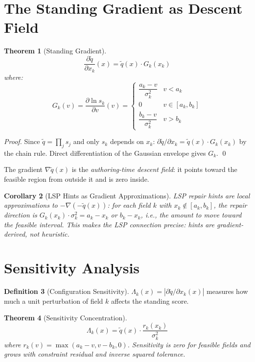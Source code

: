 \documentclass[12pt, letterpaper]{report}
\theoremstyle{plain}
\newtheorem{theorem}{Theorem}[chapter]
\newtheorem{corollary}[theorem]{Corollary}
\theoremstyle{definition}
\newtheorem{definition}[theorem]{Definition}
\theoremstyle{remark}
\newcommand{\abs}[1]{\left\lvert #1 \right\rvert}
\begin{document}
\section{The Standing Gradient as Descent Field}

\begin{theorem}[Standing Gradient]
\label{thm:gradient}
\[
  \frac{\partial \tilde{q}}{\partial x_k}(x) = \tilde{q}(x) \cdot G_k(x_k)
\]
where:
\[
  G_k(v) = \frac{\partial \ln s_k}{\partial v}(v) =
  \begin{cases}
    \dfrac{a_k - v}{\sigma_k^2} & v < a_k \\[8pt]
    0 & v \in [a_k, b_k] \\[4pt]
    \dfrac{b_k - v}{\sigma_k^2} & v > b_k
  \end{cases}
\]
\end{theorem}

\begin{proof}
Since $\tilde{q} = \prod_j s_j$ and only $s_k$ depends on $x_k$:
$\partial\tilde{q}/\partial x_k = \tilde{q}(x) \cdot G_k(x_k)$
by the chain rule. Direct differentiation of the Gaussian envelope
gives $G_k$. \qed
\end{proof}

The gradient $\nabla\tilde{q}(x)$ is the \emph{authoring-time descent
field}: it points toward the feasible region from outside it and is
zero inside.

\begin{corollary}[LSP Hints as Gradient Approximations]
LSP repair hints are local approximations to $-\nabla(-\tilde{q}(x))$:
for each field $k$ with $x_k \notin [a_k, b_k]$,
the repair direction is $G_k(x_k) \cdot \sigma_k^2 = a_k - x_k$ or
$b_k - x_k$, i.e., the amount to move toward the feasible interval.
This makes the LSP connection precise:
hints are gradient-derived, not heuristic.
\end{corollary}

\section{Sensitivity Analysis}

\begin{definition}[Configuration Sensitivity]
$\Lambda_k(x) = \abs{\partial\tilde{q}/\partial x_k(x)}$
measures how much a unit perturbation of field $k$ affects the standing score.
\end{definition}

\begin{theorem}[Sensitivity Concentration]
\label{thm:sensitivity}
\[
  \Lambda_k(x) = \tilde{q}(x) \cdot \frac{r_k(x_k)}{\sigma_k^2}
\]
where $r_k(v) = \max(a_k - v, v - b_k, 0)$.
Sensitivity is zero for feasible fields and grows with constraint residual
and inverse squared tolerance.
\end{theorem}
\end{document}
